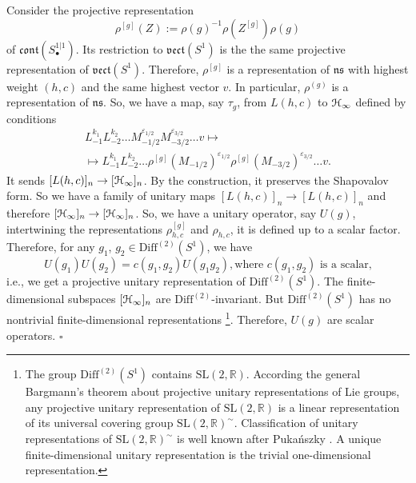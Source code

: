 \documentclass[]{amsart}
\def\SL{\mathrm {SL}}
\def\epsilon{\varepsilon}
\def\cH{\EuScript H}
\def\R {{\mathbb R }}
\def\ov{\overline}
\def\0{{\ov 0}}
\def\Diff{\mathrm{Diff}}
\def\vect{\mathfrak{vect}}
\def\ns{\mathfrak{ns}}
\def\cont{\mathfrak{cont}}
\begin{document}
Consider the  projective representation
$$
\rho^{[g]}(Z):=\rho(g)^{-1} \rho(Z^{[g]}) \rho(g)
$$
of $\cont(S^{1|1}_\bullet)$.
Its restriction to $\vect(S^1)$
is the the same projective representation of $\vect(S^1)$.
 Therefore, 
 $\rho^{[g]}$ is a   representation
 of $\ns$ with highest weight $(h,c)$ and the same highest vector
$v$. In particular, $\rho^{(g)}$ is a representation of $\ns$. So, 
we have a map, say $\tau_g$, from
 $L(h,c)$ to $\cH_\infty$
defined by conditions 
\begin{multline*}
 L_{-1}^{k_1} L_{-2}^{k_2}\dots M_{-1/2}^{\epsilon_{1/2}} M_{-3/2}^{\epsilon_{3/2}}\dots v\mapsto
 \\
 \mapsto
 L_{-1}^{k_1} L_{-2}^{k_2}\dots \rho^{[g]}(M_{-1/2})^{\epsilon_{1/2}} \rho^{[g]}(M_{-3/2})^{\epsilon_{3/2}}\dots v.
\end{multline*}
It sends $[L(h,c)]_n\to [\cH_\infty]_n$. By the construction, it preserves the Shapovalov form. So we have a family of unitary
maps $[L(h,c)]_n\to [L(h,c)]_n$ and therefore $[\cH_\infty]_n \to [\cH_\infty]_n$. So, we have a unitary operator,
say $U(g)$, intertwining the representations $\rho_{h,c}^{[g]}$ and $\rho_{h,c}$, it is defined up to a scalar factor.
Therefore, for any $g_1$, $g_2\in \Diff^{(2)}(S^1)$, we have
$$
U(g_1) U(g_2)= c(g_1,g_2) U(g_1g_2), \text{where $c(g_1,g_2)$ is a scalar,}
$$
i.e., we get a projective unitary representation of $\Diff^{(2)}(S^1)$. The finite-dimensional subspaces
$[\cH_\infty]_n$ are $\Diff^{(2)}$-invariant. But $\Diff^{(2)}(S^1)$ has no nontrivial finite-dimensional representations%
\footnote{The group $\Diff^{(2)}(S^1)$ contains $\SL(2,\R)$. According the general Bargmann's theorem \cite{Bar} about projective unitary
representations of Lie groups, any projective unitary representation of $\SL(2,\R)$ is a linear representation of its universal covering
group $\SL(2,\R)^\sim$. Classification of unitary representations of $\SL(2,\R)^\sim$ is well known after Puka\'nszky \cite{Puk}. A unique finite-dimensional unitary representation is the trivial one-dimensional representation.}.
Therefore, $U(g)$
are scalar operators.
\hfill $\square$






\end{document}
